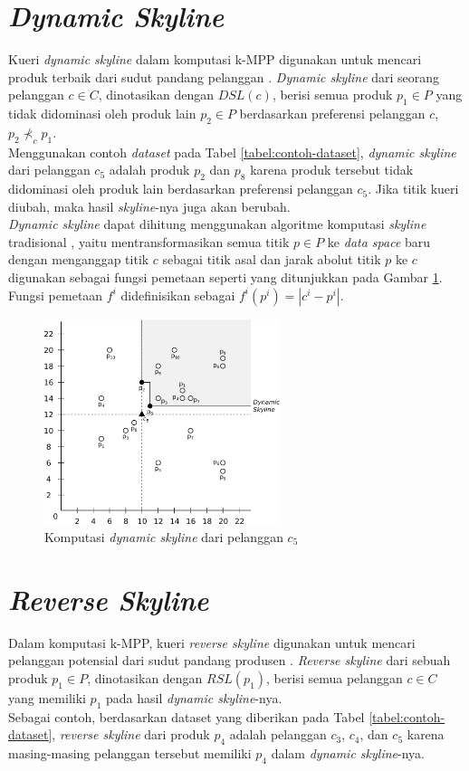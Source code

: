 \section{\textit{Dynamic Skyline}}
\tab Kueri \textit{dynamic skyline} dalam komputasi k-MPP digunakan untuk mencari produk terbaik dari sudut pandang pelanggan \cite{kmpp}. \textit{Dynamic skyline} \cite{dynamic-skyline} dari seorang pelanggan $c \in C$, dinotasikan dengan $DSL(c)$, berisi semua produk $p_1 \in P$ yang tidak didominasi oleh produk lain $p_2 \in P$ berdasarkan preferensi pelanggan $c$, $p_2 \nprec_c p_1$.\\
\tab Menggunakan contoh \textit{dataset} pada Tabel \ref{tabel:contoh-dataset}, \textit{dynamic skyline} dari pelanggan $c_5$ adalah produk $p_2$ dan $p_8$ karena produk tersebut tidak didominasi oleh produk lain berdasarkan preferensi pelanggan $c_5$. Jika titik kueri diubah, maka hasil \textit{skyline}-nya juga akan berubah.\\
\tab \textit{Dynamic skyline} dapat dihitung menggunakan algoritme komputasi \textit{skyline} tradisional \cite{skyline}, yaitu mentransformasikan semua titik $p \in P$ ke \textit{data space} baru dengan menganggap titik $c$ sebagai titik asal dan jarak abolut titik $p$ ke $c$ digunakan sebagai fungsi pemetaan seperti yang ditunjukkan pada Gambar \ref{figure:cnt-dsl}. Fungsi pemetaan $f^i$ didefinisikan sebagai $f^i (p^i) = |c^i-p^i|$.

\begin{figure}[H]
	\centerline {
		\includegraphics[height=6cm]{bab2/img/dsl.png}
	}
	\caption{Komputasi \textit{dynamic skyline} dari pelanggan $c_5$}
	\label{figure:cnt-dsl}
\end{figure}

\section{\textit{Reverse Skyline}}
\tab Dalam komputasi k-MPP, kueri \textit{reverse skyline} digunakan untuk mencari pelanggan potensial dari sudut pandang produsen \cite{kmpp}. \textit{Reverse skyline} \cite{reverse-skyline} dari sebuah produk $p_1 \in
P$, dinotasikan dengan $RSL(p_1)$, berisi semua pelanggan $c \in C$ yang memiliki $p_1$ pada hasil \textit{dynamic skyline}-nya.\\
\tab Sebagai contoh, berdasarkan dataset yang diberikan pada Tabel \ref{tabel:contoh-dataset}, \textit{reverse skyline} dari produk $p_4$ adalah pelanggan $c_3$, $c_4$, dan $c_5$ karena masing-masing pelanggan tersebut memiliki $p_4$ dalam \textit{dynamic skyline}-nya.\\

